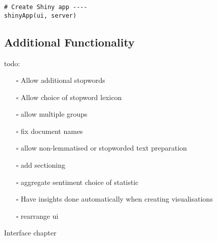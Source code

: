 \documentclass[a4paper, 11pt]{article}
\begin{document}
\begin{verbatim}
# Create Shiny app ----
shinyApp(ui, server)
\end{verbatim}
\subsection{Additional Functionality}
\label{sec:orgc87156c}
todo:

\begin{itemize}
\item[{$\square$}] Allow additional stopwords
\item[{$\square$}] Allow choice of stopword lexicon
\item[{$\square$}] allow multiple groups
\item[{$\square$}] fix document names
\item[{$\square$}] allow non-lemmatised or stopworded text preparation
\item[{$\square$}] add sectioning
\item[{$\square$}] aggregate sentiment choice of statistic
\item[{$\square$}] Have insights done automatically when creating visualisations
\item[{$\square$}] rearrange ui
\end{itemize}

Interface chapter
\end{document}
